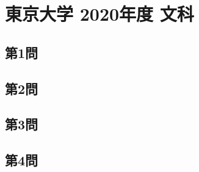 ﻿\documentclass[../../uem_tok_q.tex]{subfiles}
\begin{document}
    \section{東京大学 2020年度 文科}

    \subsection{第1問}
    

    \vfill
    \subsection{第2問}
    

    \vfill
    \newpage
    \subsection{第3問}
    

    \vfill
    \subsection{第4問}
    

    \vfill
\end{document}

